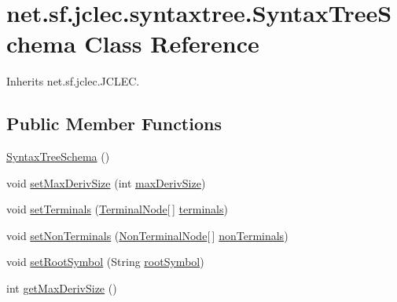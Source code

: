 \hypertarget{classnet_1_1sf_1_1jclec_1_1syntaxtree_1_1_syntax_tree_schema}{\section{net.\-sf.\-jclec.\-syntaxtree.\-Syntax\-Tree\-Schema Class Reference}
\label{classnet_1_1sf_1_1jclec_1_1syntaxtree_1_1_syntax_tree_schema}
}


Inherits net.\-sf.\-jclec.\-J\-C\-L\-E\-C.

\subsection*{Public Member Functions}
\begin{DoxyCompactItemize}
\item 
\hyperlink{classnet_1_1sf_1_1jclec_1_1syntaxtree_1_1_syntax_tree_schema_af7c935a010de17296f037660fe17959d}{Syntax\-Tree\-Schema} ()
\item 
void \hyperlink{classnet_1_1sf_1_1jclec_1_1syntaxtree_1_1_syntax_tree_schema_aa1697a0fcb9cdd4239c272cadf6f707d}{set\-Max\-Deriv\-Size} (int \hyperlink{classnet_1_1sf_1_1jclec_1_1syntaxtree_1_1_syntax_tree_schema_a6f8c08c9aac2df7a5e3423cad6a25f4f}{max\-Deriv\-Size})
\item 
void \hyperlink{classnet_1_1sf_1_1jclec_1_1syntaxtree_1_1_syntax_tree_schema_a64894d1775707a758e7530bc3ad37403}{set\-Terminals} (\hyperlink{classnet_1_1sf_1_1jclec_1_1syntaxtree_1_1_terminal_node}{Terminal\-Node}\mbox{[}$\,$\mbox{]} \hyperlink{classnet_1_1sf_1_1jclec_1_1syntaxtree_1_1_syntax_tree_schema_adb1b36c1f168bd3f87dad9e1f40e7c4d}{terminals})
\item 
void \hyperlink{classnet_1_1sf_1_1jclec_1_1syntaxtree_1_1_syntax_tree_schema_a6a0f8e5dbc7fe09076993dec520c5b61}{set\-Non\-Terminals} (\hyperlink{classnet_1_1sf_1_1jclec_1_1syntaxtree_1_1_non_terminal_node}{Non\-Terminal\-Node}\mbox{[}$\,$\mbox{]} \hyperlink{classnet_1_1sf_1_1jclec_1_1syntaxtree_1_1_syntax_tree_schema_a9029c7ded48bc795194faff53e13c2b2}{non\-Terminals})
\item 
void \hyperlink{classnet_1_1sf_1_1jclec_1_1syntaxtree_1_1_syntax_tree_schema_a547942c653bf6e9f7412949ff9a9294f}{set\-Root\-Symbol} (String \hyperlink{classnet_1_1sf_1_1jclec_1_1syntaxtree_1_1_syntax_tree_schema_aab4ff6d931566275df40f10f0a38f3ba}{root\-Symbol})
\item 
int \hyperlink{classnet_1_1sf_1_1jclec_1_1syntaxtree_1_1_syntax_tree_schema_ac5114909242387b97a62c9767ee2e8c1}{get\-Max\-Deriv\-Size} ()

\end{DoxyCompactItemize}
